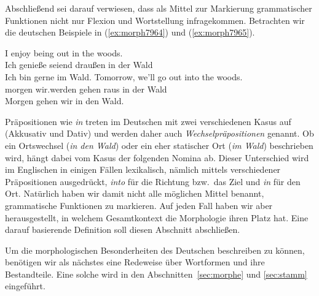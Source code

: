 Abschließend sei darauf verwiesen, dass als Mittel zur Markierung grammatischer Funktionen nicht nur Flexion und Wortstellung infragekommen.
Betrachten wir die deutschen Beispiele in (\ref{ex:morph7964}) und (\ref{ex:morph7965}).

\begin{exe}
  \ex \label{ex:morph7964}
  \begin{xlist}
  \end{xlist}
  \ex \label{ex:morph7965}
  \begin{xlist}
    \ex\gll I enjoy being out in the woods.\\
    Ich genieße seiend draußen in der Wald\\
    \glt Ich bin gerne im Wald. 
    \ex\gll Tomorrow, {we'll} go out into the woods.\\
    morgen {wir.werden} gehen raus in der Wald\\
    \glt Morgen gehen wir in den Wald.
  \end{xlist}
\end{exe}


Präpositionen wie \textit{in} treten im Deutschen mit zwei verschiedenen Kasus auf (Akkusativ und Dativ) und werden daher auch \textit{Wechselpräpositionen} genannt.
Ob ein Ortswechsel (\textit{in den Wald}) oder ein eher statischer Ort (\textit{im Wald}) beschrieben wird, hängt dabei vom Kasus der folgenden Nomina ab.
Dieser Unterschied wird \zB im Englischen in einigen Fällen lexikalisch, nämlich mittels verschiedener Präpositionen ausgedrückt, \textit{into} für die Richtung bzw.\ das Ziel und \textit{in} für den Ort.
Natürlich haben wir damit nicht alle möglichen Mittel benannt, grammatische Funktionen zu markieren.
Auf jeden Fall haben wir aber herausgestellt, in welchem Gesamtkontext die Morphologie ihren Platz hat.
Eine darauf basierende Definition soll diesen Abschnitt abschließen.


Um die morphologischen Besonderheiten des Deutschen beschreiben zu können, benötigen wir als nächstes eine Redeweise über Wortformen und ihre Bestandteile.
Eine solche wird in den Abschnitten~\ref{sec:morphe} und \ref{sec:stamm} eingeführt.

